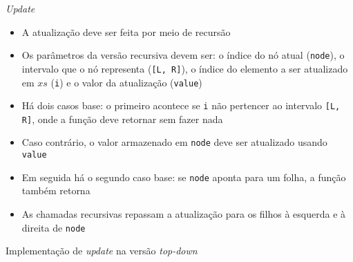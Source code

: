 \begin{frame}[fragile]{\it Update}

    \begin{itemize}
        \item A atualização deve ser feita por meio de recursão

        \item Os parâmetros da versão recursiva devem ser: o índice do nó atual (\texttt{node}),
            o intervalo que o nó representa (\texttt{[L, R]}), o índice do elemento a ser 
            atualizado em $xs$ (\texttt{i}) e o valor da atualização (\texttt{value})

        \item Há dois casos base: o primeiro acontece se \texttt{i} não pertencer ao intervalo 
            \texttt{[L, R]}, onde a função deve retornar sem fazer nada

        \item Caso contrário, o valor armazenado em \texttt{node} deve ser atualizado usando
            \texttt{value}

        \item Em seguida há o segundo caso base: se \texttt{node} aponta para um folha, a função
            também retorna

        \item As chamadas recursivas repassam a atualização para os filhos à esquerda e à direita
            de \texttt{node}

    \end{itemize}

\end{frame}



\begin{frame}[fragile]{Implementação de {\it update} na versão {\it top-down}}
\end{frame}

